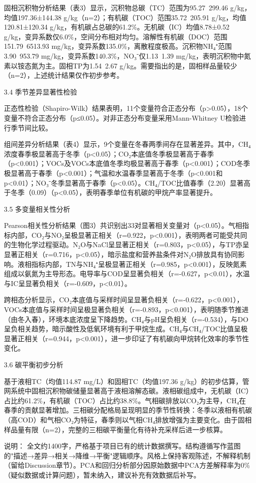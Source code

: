 固相沉积物分析结果（表3）显示，沉积物总碳（TC）范围为95.27~299.46 g/kg，均值197.36±144.38 g/kg（n=2）；有机碳（TOC）范围35.72~205.91 g/kg，均值120.81±120.34 g/kg，有机碳占总碳的61.2\%。无机碳（IC）均值8.78±0.52 g/kg，变异系数仅6.0\%，空间分布相对均匀。溶解性有机碳（DOC）范围151.79~6513.93 mg/kg，变异系数135.0\%，离散程度极高。沉积物NH₄⁺范围3.90~953.79 mg/kg，变异系数140.3\%，NO₃⁻仅1.13~1.39 mg/kg，表明沉积物中氮素以铵态氮为主。固相TP为1.54~2.67 g/kg。需要指出的是，固相样品量较少（n=2），上述统计结果仅作初步参考。

3.4 季节差异显著性检验

正态性检验（Shapiro-Wilk）结果表明，11个变量符合正态分布（p>0.05），18个变量不符合正态分布（p≤0.05）。对非正态分布变量采用Mann-Whitney U检验进行季节间比较。

组间差异分析结果（表4）显示，9个变量在冬春两季间存在显著差异。其中，CH₄浓度春季极显著高于冬季（p<0.05）；CO₂本底值冬季极显著高于春季（p<0.001）；VOCs及VOCs本底值冬季均极显著高于春季（p<0.001）；COD冬季极显著高于春季（p<0.001）；气温和水温春季显著高于冬季（p<0.001和p<0.01）；NO₃⁻冬季显著高于春季（p<0.05）。CH₄/TOC比值春季（2.20）显著高于冬季（0.09）（p<0.05），表明春季单位有机碳的甲烷产率显著提升。

3.5 多变量相关性分析

Pearson相关性分析结果（图3）共识别出33对显著相关变量对（p<0.05）。气相指标内部，CO₂与NO₂呈极显著正相关（r=0.922，p<0.001），表明两者可能受共同的生物化学过程驱动。N₂O与NaCl呈显著正相关（r=0.803，p<0.05），与TP亦呈显著正相关（r=0.716，p<0.05），暗示盐度和营养盐条件对N₂O排放具有协同影响。液相指标内部，TN与NH₄⁺呈极显著正相关（r=0.985，p<0.001），反映氮素组成以氨氮为主导形态。电导率与COD呈显著负相关（r=-0.627，p<0.01），水温与IC呈显著负相关（r=-0.609，p<0.01）。

跨相态分析显示，CO₂本底值与采样时间呈显著负相关（r=-0.622，p<0.001），VOCs本底值与采样时间呈极显著负相关（r=-0.893，p<0.001），表明随季节推进（由冬入春），环境本底浓度呈下降趋势。CH₄与pH呈负相关（r=-0.534），与DO呈负相关趋势，暗示酸性及低氧环境有利于甲烷生成。CH₄与CH₄/TOC比值呈极显著正相关（r=0.944，p<0.001），进一步印证了有机碳向甲烷转化效率的季节性变化。

3.6 碳平衡初步分析

基于液相TC（均值114.87 mg/L）和固相TC（均值197.36 g/kg）的初步估算，管网系统中固相沉积物碳储量显著高于液相溶解态碳。液相碳组成中，无机碳（IC）占比约61.2\%，有机碳（TOC）占比约38.8\%。气相碳排放以CO₂为主导，CH₄在春季的贡献显著增加。三相碳分配格局呈现明显的季节性转换：冬季以液相有机碳（高COD）和气相CO₂为特征，春季则以气相CH₄排放增强为主要变化。由于固相样品量有限（n=2），完整的三相碳平衡量化有待补充采样后进一步核算。

说明： 全文约1400字，严格基于项目已有的统计数据撰写。结构遵循写作蓝图的"描述→差异→相关→降维→平衡"逻辑顺序。风格上保持客观陈述，不解释机制（留给Discussion章节）。PCA和回归分析部分因原始数据中PCA方差解释率为0\%（疑似数据或计算问题），暂未纳入，建议补充有效数据后补写。